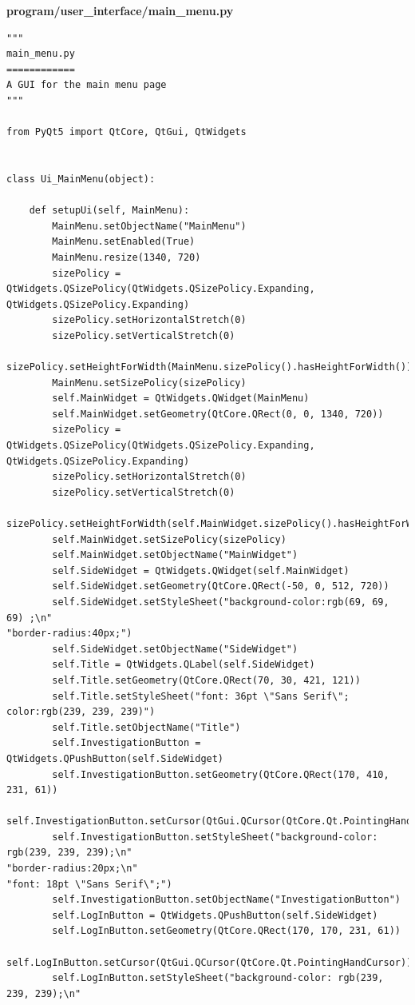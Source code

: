 \documentclass{article}
\begin{document}
\textbf{program/user\_interface/main\_menu.py}
\begin{lstlisting}
"""
main_menu.py
============
A GUI for the main menu page
"""

from PyQt5 import QtCore, QtGui, QtWidgets


class Ui_MainMenu(object):

    def setupUi(self, MainMenu):
        MainMenu.setObjectName("MainMenu")
        MainMenu.setEnabled(True)
        MainMenu.resize(1340, 720)
        sizePolicy = QtWidgets.QSizePolicy(QtWidgets.QSizePolicy.Expanding, QtWidgets.QSizePolicy.Expanding)
        sizePolicy.setHorizontalStretch(0)
        sizePolicy.setVerticalStretch(0)
        sizePolicy.setHeightForWidth(MainMenu.sizePolicy().hasHeightForWidth())
        MainMenu.setSizePolicy(sizePolicy)
        self.MainWidget = QtWidgets.QWidget(MainMenu)
        self.MainWidget.setGeometry(QtCore.QRect(0, 0, 1340, 720))
        sizePolicy = QtWidgets.QSizePolicy(QtWidgets.QSizePolicy.Expanding, QtWidgets.QSizePolicy.Expanding)
        sizePolicy.setHorizontalStretch(0)
        sizePolicy.setVerticalStretch(0)
        sizePolicy.setHeightForWidth(self.MainWidget.sizePolicy().hasHeightForWidth())
        self.MainWidget.setSizePolicy(sizePolicy)
        self.MainWidget.setObjectName("MainWidget")
        self.SideWidget = QtWidgets.QWidget(self.MainWidget)
        self.SideWidget.setGeometry(QtCore.QRect(-50, 0, 512, 720))
        self.SideWidget.setStyleSheet("background-color:rgb(69, 69, 69) ;\n"
"border-radius:40px;")
        self.SideWidget.setObjectName("SideWidget")
        self.Title = QtWidgets.QLabel(self.SideWidget)
        self.Title.setGeometry(QtCore.QRect(70, 30, 421, 121))
        self.Title.setStyleSheet("font: 36pt \"Sans Serif\"; color:rgb(239, 239, 239)")
        self.Title.setObjectName("Title")
        self.InvestigationButton = QtWidgets.QPushButton(self.SideWidget)
        self.InvestigationButton.setGeometry(QtCore.QRect(170, 410, 231, 61))
        self.InvestigationButton.setCursor(QtGui.QCursor(QtCore.Qt.PointingHandCursor))
        self.InvestigationButton.setStyleSheet("background-color: rgb(239, 239, 239);\n"
"border-radius:20px;\n"
"font: 18pt \"Sans Serif\";")
        self.InvestigationButton.setObjectName("InvestigationButton")
        self.LogInButton = QtWidgets.QPushButton(self.SideWidget)
        self.LogInButton.setGeometry(QtCore.QRect(170, 170, 231, 61))
        self.LogInButton.setCursor(QtGui.QCursor(QtCore.Qt.PointingHandCursor))
        self.LogInButton.setStyleSheet("background-color: rgb(239, 239, 239);\n"

\end{lstlisting}
\end{document}
